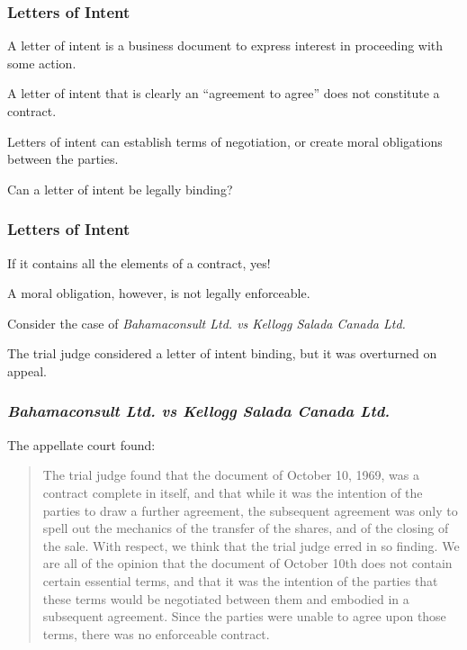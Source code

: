 \begin{frame}
\frametitle{Letters of Intent}
A \alert{letter of intent} is a business document to express interest in proceeding with some action.

A letter of intent that is clearly an ``agreement to agree'' does not constitute a contract.

Letters of intent can establish terms of negotiation, or create moral obligations between the parties.

Can a letter of intent be legally binding?

\end{frame}



\begin{frame}
\frametitle{Letters of Intent}

If it contains all the elements of a contract, yes!

A moral obligation, however, is not legally enforceable.

Consider the case of \textit{Bahamaconsult Ltd. vs Kellogg Salada Canada Ltd.}

The trial judge considered a letter of intent binding, but it was overturned on appeal.

\end{frame}



\begin{frame}
\frametitle{\textit{Bahamaconsult Ltd. vs Kellogg Salada Canada Ltd.}}

The appellate court found:
\begin{quote}
The trial judge found that the document of October 10, 1969, was a contract complete in itself, and that while it was the intention of the parties to draw a further agreement, the subsequent agreement was only to spell out the mechanics of the transfer of the shares, and of the closing of the sale.  With respect, we think that the trial judge erred in so finding.  We are all of the opinion that the document of October 10th does not contain certain essential terms, and that it was the intention of the parties that these terms would be negotiated between them and embodied in a subsequent agreement.  Since the parties were unable to agree upon those terms, there was no enforceable contract.
\end{quote}

\end{frame}



